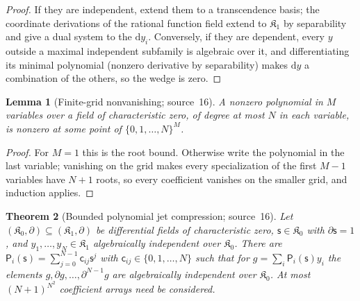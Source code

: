 \documentclass[11pt]{article}
\numberwithin{equation}{section}
\newtheorem{theorem}{Theorem}[section]
\newtheorem{lemma}[theorem]{Lemma}
\theoremstyle{definition}
\theoremstyle{remark}
\begin{document}
\begin{proof}
If they are independent, extend them to a transcendence basis; the coordinate
derivations of the rational function field extend to $\mathfrak K_1$ by
separability and give a dual system to the $\mathrm dy_i$. Conversely, if they
are dependent, every $y$ outside a maximal independent subfamily is algebraic
over it, and differentiating its minimal polynomial (nonzero derivative by
separability) makes $\mathrm dy$ a combination of the others, so the wedge is
zero.
\end{proof}

\begin{lemma}[Finite-grid nonvanishing; source~16]\label{hol:th:lem:grid}
A nonzero polynomial in $M$ variables over a field of characteristic zero, of
degree at most $N$ in each variable, is nonzero at some point of
$\{0,1,\ldots,N\}^M$.
\end{lemma}

\begin{proof}
For $M=1$ this is the root bound. Otherwise write the polynomial in the last
variable; vanishing on the grid makes every specialization of the first $M-1$
variables have $N+1$ roots, so every coefficient vanishes on the smaller
grid, and induction applies.
\end{proof}

\begin{theorem}[Bounded polynomial jet compression; source~16]
\label{hol:th:thm:compression}
Let $(\mathfrak K_0,\partial)\subseteq(\mathfrak K_1,\partial)$ be differential
fields of characteristic zero, $\mathsf s\in\mathfrak K_0$ with
$\partial\mathsf s=1$, and $y_1,\ldots,y_N\in\mathfrak K_1$ algebraically
independent over $\mathfrak K_0$. There are
$\mathsf P_i(\mathsf s)=\sum_{j=0}^{N-1}\mathsf c_{ij}\mathsf s^j$ with
$\mathsf c_{ij}\in\{0,1,\ldots,N\}$ such that for
$g=\sum_i\mathsf P_i(\mathsf s)y_i$ the elements
$g,\partial g,\ldots,\partial^{N-1}g$ are algebraically independent over
$\mathfrak K_0$. At most $(N+1)^{N^2}$ coefficient arrays need be considered.
\end{theorem}
\end{document}
